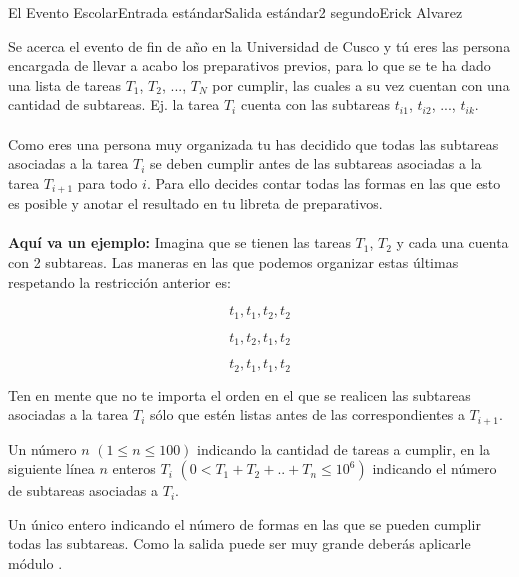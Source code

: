 \begin{problem}{El Evento Escolar}{Entrada estándar}{Salida estándar}{2 segundo}{}{Erick Alvarez}

Se acerca el evento de fin de año en la Universidad de Cusco y tú eres las persona encargada de llevar a acabo los preparativos previos, para lo que se te ha dado una lista de tareas $T_1$, $T_2$, ..., $T_N$ por cumplir, las cuales a su vez cuentan con una cantidad de subtareas. Ej. la tarea $T_i$ cuenta con las subtareas $t_{i1}$, $t_{i2}$, ..., $t_{ik}$.\\\\

Como eres una persona muy organizada tu has decidido que todas las subtareas asociadas a la tarea $T_i$ se deben cumplir antes de las subtareas asociadas a la tarea $T_{i+1}$ para todo $i$. Para ello decides contar todas las formas en las que esto es posible y anotar el resultado en tu libreta de preparativos.\\\\

\textbf{Aquí va un ejemplo:} Imagina que se tienen las tareas $T_1$, $T_2$ y cada una cuenta con 2 subtareas.
Las maneras en las que podemos organizar estas últimas respetando la restricción anterior es:

$$t_{1}, t_{1}, t_{2}, t_{2}$$

$$t_{1}, t_{2}, t_{1}, t_{2}$$

$$t_{2}, t_{1}, t_{1}, t_{2}$$

Ten en mente que no te importa el orden en el que se realicen las subtareas asociadas a la tarea $T_i$ sólo que estén listas antes de las correspondientes a $T_{i+1}$.

\InputFile

Un número $n$ $(1 \leq n \leq 100)$ indicando la cantidad de tareas a cumplir, en la siguiente línea $n$ enteros  $T_i$ $(0 < T_1 + T_2 + .. + T_n \leq 10^6)$ indicando el número de subtareas asociadas a $T_i$.


\OutputFile

Un único entero indicando el número de formas en las que se pueden cumplir todas las subtareas. Como la salida puede ser muy grande deberás aplicarle módulo .


\Example

\begin{example}
\end{example}

\end{problem}

